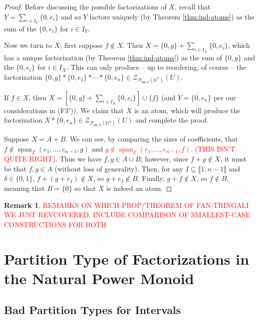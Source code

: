 \documentclass{report}
\newcommand{\NN}{\mathbb{N}}
\renewcommand{\P}{\mathcal{P}}
\newcommand{\ZZ}{\mathbb{Z}}
\newcommand{\Z}{\mathcal{Z}}
\newcommand{\llb}{\llbracket}
\newcommand{\rrb}{\rrbracket}
\newcommand{\fin}{\textrm{fin}}
\newcommand{\fon}{{\textrm{fin}, 0}}
\renewcommand{\:}{\text{:}}
\theoremstyle{definition}
\newtheorem{rk}[defn]{Remark}
\begin{document}
\begin{proof}
Before discussing the possible factorizations of $X$, recall that $Y = \sum_{i\in I_Y} \{0,e_i\}$ and so $Y$ factors uniquely (by Theorem \ref{thm:ind-atoms}) as the sum of the $\{0,e_i\}$ for $i\in I_Y$.

Now we turn to $X$; first suppose $f\notin X$.
Then $X = \{0,g\} +\sum_{i\in I_X} \{0,e_i\}$, which has a unique factorization (by Theorem \ref{thm:ind-atoms}) as the sum of $\{0,g\}$ and the $\{0,e_i\}$ for $i\in I_X$.
This can only produce -- up to reordering, of course -- the factorization $\{0,g\}*\{0,e_1\}*\cdots*\{0,e_n\}\in \Z_{\P_\fon(\NN^n)}(U)$.

If $f\in X$, then $X = \left[\{0,g\}+\sum_{i\in I_X} \{0,e_i\} \right]\cup\{f\}$ (and $Y = \{0,e_n\}$ per our considerations in (F3$'$)).
We claim that $X$ is an atom, which will produce the factorization $X*\{0,e_n\}\in \Z_{\P_\fon(\NN^n)}(U)$ and complete the proof.

Suppose $X = A + B$.
We can see, by comparing the sizes of coefficients, that $f \notin \operatorname{span}_\ZZ(e_1,\dots, e_{n-1},g)$ and \textcolor{red}{$g\notin \operatorname{span}_\ZZ(e_1,\dots, e_{n-1},f)$. (THIS ISN'T QUITE RIGHT).}
Thus we have $f,g\in A\cup B$; however, since $f+g\notin X$, it must be that $f,g\in A$ (without loss of generality).
Then, for any $I\subseteq \llb 1,n-1\rrb$ and $\delta\in \{0,1\}$, $f + (g+ e_I) \notin X$, so $g+e_I\notin B$.
Finally, $g + f \notin X$, so $f\notin B$, meaning that $B = \{0\}$ so that $X$ is indeed an atom.
\end{proof}


\begin{rk}
	\textcolor{red}{REMARKS ON WHICH PROP/THEOREM OF FAN-TRINGALI WE JUST REVCOVERED.
		INCLUDE COMPARISON OF SMALLEST-CASE CONSTRUCTIONS FOR BOTH}
\end{rk}



\chapter{Partition Type of Factorizations in the Natural Power Monoid}
\section{Bad Partition Types for Intervals} \label{sec:partitions}


\end{document}
